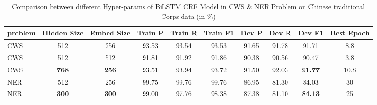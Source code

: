 \begin{table*}[htbp!]
    \centering
    \begin{tabular}{lccccccccc}
    \midrule
    problem & Hidden Size  &  Embed Size  & Train P   & Train R     & Train F1    & Dev P      & Dev R & Dev F1 & Best Epoch\\
    \midrule
   
    CWS & 512         & 256        & 93.53   & 93.54   & 93.53    & 91.65 & 91.78 & 91.71     & 8.8        \\
    CWS & 512         & 512        & 91.81   & 91.92   & 91.86    & 90.38 & 90.56 & 90.47     & 3.8        \\
    CWS & \underline{\bf768}& \underline{\bf256}        & 93.51   & 93.94   & 93.72    & 91.50 & 92.03 & \bf91.77  & 10.8       \\
    NER & 512         & 256        & 99.75   & 99.76   & 99.76    & 86.95 & 81.30 & 84.03     & 30         \\
    NER & \underline{\bf300}& \underline{\bf300}& 99.00   & 97.76   & 98.38    & 87.38 & 81.10 & \bf84.13  & 25         \\

    \bottomrule
    \end{tabular}
\caption{Comparison between different Hyper-params of BiLSTM CRF Model in CWS \& NER Problem on Chinese traditional Corps data (in \%)}
\label{tab:batchSize}
\end{table*}
